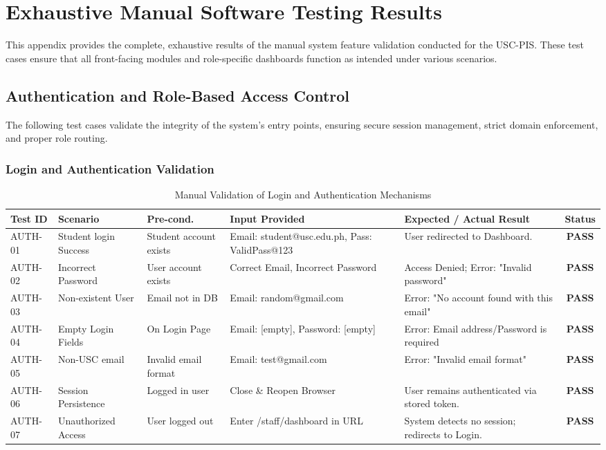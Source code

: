 
\chapter{Exhaustive Manual Software Testing Results}
\label{appendix:manual_testing}

This appendix provides the complete, exhaustive results of the manual system feature validation conducted for the USC-PIS. These test cases ensure that all front-facing modules and role-specific dashboards function as intended under various scenarios.

\section{Authentication and Role-Based Access Control}
The following test cases validate the integrity of the system's entry points, ensuring secure session management, strict domain enforcement, and proper role routing.

\subsection{Login and Authentication Validation}
\begin{table}[H]
\centering
\caption{Manual Validation of Login and Authentication Mechanisms}
\begin{tabularx}{\textwidth}{|l|Y|Y|Y|Y|c|}
\hline
\textbf{Test ID} & \textbf{Scenario} & \textbf{Pre-cond.} & \textbf{Input Provided} & \textbf{Expected / Actual Result} & \textbf{Status} \\
\hline
AUTH-01 & Student login Success & Student account exists & Email: student@usc.edu.ph, Pass: ValidPass@123 & User redirected to Dashboard. & \textbf{PASS} \\
\hline
AUTH-02 & Incorrect Password & User account exists & Correct Email, Incorrect Password & Access Denied; Error: "Invalid password" & \textbf{PASS} \\
\hline
AUTH-03 & Non-existent User & Email not in DB & Email: random@gmail.com & Error: "No account found with this email" & \textbf{PASS} \\
\hline
AUTH-04 & Empty Login Fields & On Login Page & Email: [empty], Password: [empty] & Error: Email address/Password is required & \textbf{PASS} \\
\hline
AUTH-05 & Non-USC email & Invalid email format & Email: test@gmail.com & Error: "Invalid email format" & \textbf{PASS} \\
\hline
AUTH-06 & Session Persistence & Logged in user & Close \& Reopen Browser & User remains authenticated via stored token. & \textbf{PASS} \\
\hline
AUTH-07 & Unauthorized Access & User logged out & Enter /staff/dashboard in URL & System detects no session; redirects to Login. & \textbf{PASS} \\
\hline
\end{tabularx}
\end{table}

